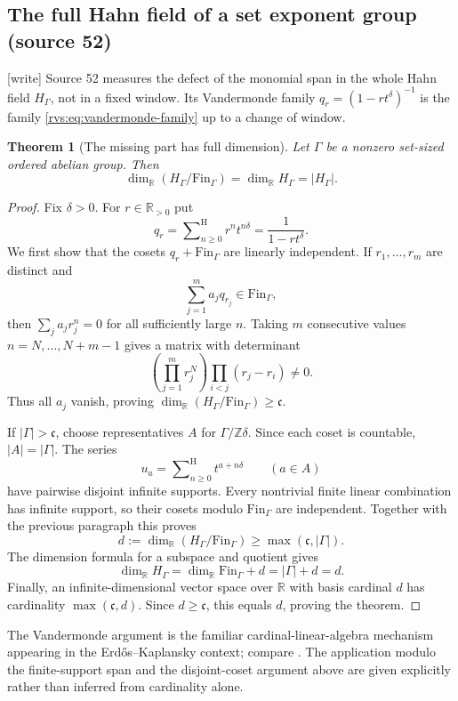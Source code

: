 \documentclass[11pt,letterpaper]{article}
\numberwithin{equation}{section}
\newtheorem{theorem}{Theorem}[section]
\theoremstyle{definition}
\theoremstyle{remark}
\newcommand{\R}{\mathbb{R}}
\newcommand{\Z}{\mathbb{Z}}
\newcommand{\ct}{\operatorname{ct}}
\newcommand{\hSum}{\mathop{\sum}\nolimits^{\mathrm H}}
\newcommand{\cont}{\mathfrak c}%
\newcommand{\FinS}[1]{\mathrm{Fin}_{#1}}%
\newcommand{\wtag}{\textup{[write]}}%
\begin{document}
\subsection{The full Hahn field of a set exponent group (source 52)}\label{rvs:w:subsec:fullcodim}

\wtag{} Source 52 measures the defect of the monomial span in the whole
Hahn field \(H_\Gamma\), not in a fixed window.  Its Vandermonde family
\(q_r=(1-rt^\delta)^{-1}\) is the family \eqref{rvs:eq:vandermonde-family}
up to a change of window.

\begin{theorem}[The missing part has full dimension]\label{rvs:eu:thm:fullcodim}
Let $\Gamma$ be a nonzero set-sized ordered abelian group. Then
\begin{equation}\label{rvs:eu:eq:fullcodim}
 \dim_\R(H_\Gamma/\FinS{\Gamma})=\dim_\R H_\Gamma=|H_\Gamma|.
\end{equation}
\end{theorem}
\begin{proof}
Fix $\delta>0$. For $r\in\R_{>0}$ put
\[
 q_r=\hSum_{n\ge0}r^n t^{n\delta}=\frac1{1-r t^\delta}.
\]
We first show that the cosets $q_r+\FinS{\Gamma}$ are linearly independent. If $r_1,\ldots,r_m$ are distinct and
\[
 \sum_{j=1}^m a_jq_{r_j}\in \FinS{\Gamma},
\]
then $\sum_j a_jr_j^n=0$ for all sufficiently large $n$. Taking $m$ consecutive values $n=N,\ldots,N+m-1$ gives a matrix with determinant
\[
 \left(\prod_{j=1}^m r_j^N\right)
 \prod_{i<j}(r_j-r_i)\ne0.
\]
Thus all $a_j$ vanish, proving $\dim_\R(H_\Gamma/\FinS{\Gamma})\ge\cont$.

If $|\Gamma|>\cont$, choose representatives $A$ for $\Gamma/\Z\delta$. Since each coset is countable, $|A|=|\Gamma|$. The series
\[
 u_a=\hSum_{n\ge0}t^{a+n\delta}\qquad(a\in A)
\]
have pairwise disjoint infinite supports. Every nontrivial finite linear combination has infinite support, so their cosets modulo $\FinS{\Gamma}$ are independent. Together with the previous paragraph this proves
\[
 d:=\dim_\R(H_\Gamma/\FinS{\Gamma})\ge\max(\cont,|\Gamma|).
\]
The dimension formula for a subspace and quotient gives
\[
 \dim_\R H_\Gamma=\dim_\R \FinS{\Gamma}+d=|\Gamma|+d=d.
\]
Finally, an infinite-dimensional vector space over $\R$ with basis cardinal $d$ has cardinality $\max(\cont,d)$. Since $d\ge\cont$, this equals $d$, proving the theorem.
\end{proof}
The Vandermonde argument is the familiar cardinal-linear-algebra mechanism appearing in the Erd\H{o}s--Kaplansky context; compare \cite{Kuba}. The application modulo the finite-support span and the disjoint-coset argument above are given explicitly rather than inferred from cardinality alone.
\end{document}
